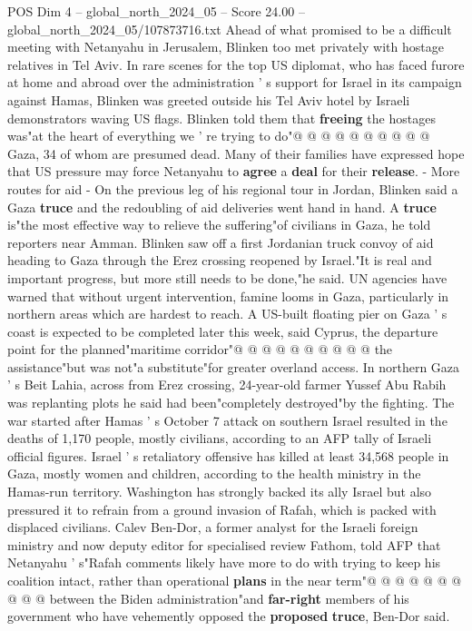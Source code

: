 \begin{textsample}{POS Dim 4 – global\_north\_2024\_05 – Score 24.00 – global\_north\_2024\_05/107873716.txt}
Ahead of what promised to be a difficult meeting with Netanyahu in Jerusalem, Blinken too met privately with hostage relatives in Tel Aviv.
In rare scenes for the top US diplomat, who has faced furore at home and abroad over the administration ' s support for Israel in its campaign against Hamas, Blinken was greeted outside his Tel Aviv hotel by Israeli demonstrators waving US flags.
Blinken told them that \textbf{freeing} the hostages was"at the heart of everything we ' re trying to do"@ @ @ @ @ @ @ @ @ @ Gaza, 34 of whom are presumed dead.
Many of their families have expressed hope that US pressure may force Netanyahu to \textbf{agree} a \textbf{deal} for their \textbf{release}. - More routes for aid - On the previous leg of his regional tour in Jordan, Blinken said a Gaza \textbf{truce} and the redoubling of aid deliveries went hand in hand.
A \textbf{truce} is"the most effective way to relieve the suffering"of civilians in Gaza, he told reporters near Amman.
Blinken saw off a first Jordanian truck convoy of aid heading to Gaza through the Erez crossing reopened by Israel."It is real and important progress, but more still needs to be done,"he said.
UN agencies have warned that without urgent intervention, famine looms in Gaza, particularly in northern areas which are hardest to reach.
A US-built floating pier on Gaza ' s coast is expected to be completed later this week, said Cyprus, the departure point for the planned"maritime corridor"@ @ @ @ @ @ @ @ @ @ the assistance"but was not"a substitute"for greater overland access.
In northern Gaza ' s Beit Lahia, across from Erez crossing, 24-year-old farmer Yussef Abu Rabih was replanting plots he said had been"completely destroyed"by the fighting.
The war started after Hamas ' s October 7 attack on southern Israel resulted in the deaths of 1,170 people, mostly civilians, according to an AFP tally of Israeli official figures.
Israel ' s retaliatory offensive has killed at least 34,568 people in Gaza, mostly women and children, according to the health ministry in the Hamas-run territory.
Washington has strongly backed its ally Israel but also pressured it to refrain from a ground invasion of Rafah, which is packed with displaced civilians.
Calev Ben-Dor, a former analyst for the Israeli foreign ministry and now deputy editor for specialised review Fathom, told AFP that Netanyahu ' s"Rafah comments likely have more to do with trying to keep his coalition intact, rather than operational \textbf{plans} in the near term"@ @ @ @ @ @ @ @ @ @ between the Biden administration"and \textbf{far-right} members of his government who have vehemently opposed the \textbf{proposed} \textbf{truce}, Ben-Dor said.

\end{textsample}

